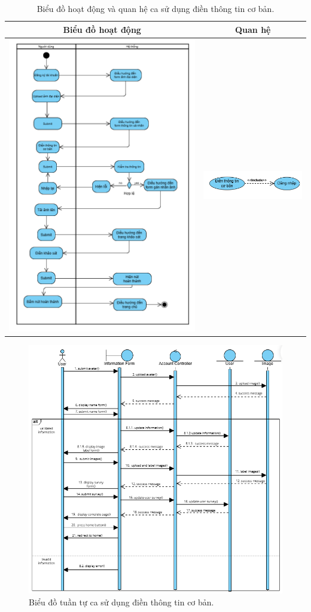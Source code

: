 \noindent
\begin{table}[H]
\centering
\begin{tabular}{| c | c |}
    \hline
    \textbf{Biểu đồ hoạt động} & \textbf{Quan hệ} \\ 
    \hline
    \includegraphics[width=0.6\linewidth]{figures/c3/3-3-3-activity-diagram.png} 
    & 
    \includegraphics[width=0.35\linewidth]{figures/c3/3-3-3-relationship.png} \\ 
    \hline
\end{tabular}
\caption{Biểu đồ hoạt động và quan hệ ca sử dụng điền thông tin cơ bản.}
\label{tab:basic-info-usecase-activity}
\end{table}

\noindent
\begin{figure}[H]
    \centering  
    \includegraphics[width=1.1\textwidth]{figures/c3/3-3-3-sequence-diagram.png}
    \caption{Biểu đồ tuần tự ca sử dụng điền thông tin cơ bản.}
    \label{fig:3-3-3-sequence-diagram}
\end{figure}